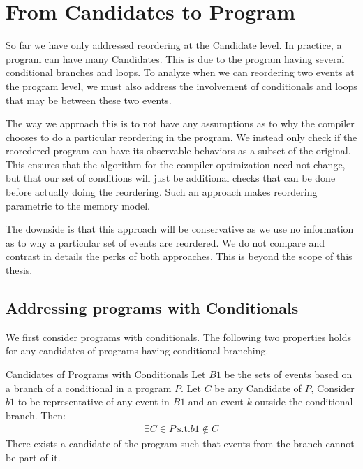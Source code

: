 \section{From Candidates to Program}

    So far we have only addressed reordering at the Candidate level. In practice, a program can have many Candidates. This is due to the program having several conditional branches and loops. To analyze when we can reordering two events at the program level, we must also address the involvement of conditionals and loops that may be between these two events.
    
    The way we approach this is to not have any assumptions as to why the compiler chooses to do a particular reordering in the program. 
    We instead only check if the reoredered program can have its observable behaviors as a subset of the original. This ensures that the algorithm for the compiler optimization need not change, but that our set of conditions will just be additional checks that can be done before actually doing the reordering. Such an approach makes reordering parametric to the memory model. 

    The downside is that this approach will be conservative as we use no information as to why a particular set of events are reordered. We do not compare and contrast in details the perks of both approaches. This is beyond the scope of this thesis.
    
    \subsection{Addressing programs with Conditionals}
        We first consider programs with conditionals. The following two properties holds for any candidates of programs having conditional branching. 

        \begin{property}{Candidates of Programs with Conditionals}
            \label{CondB1}
            Let $B1$ be the sets of events based on a branch of a conditional in a program $P$. Let $C$ be any Candidate of $P$, Consider $b1$ to be representative of any event in $B1$ and an event $k$ outside the conditional branch. Then:
            \begin{align*}
                \exists C \in P \ \text{s.t.} b1 \notin C  
            \end{align*}
            There exists a candidate of the program such that events from the branch cannot be part of it\footnotemark. 
        \end{property}

